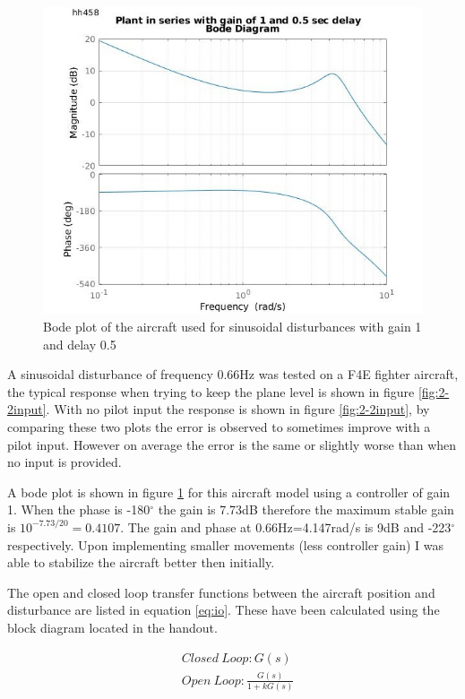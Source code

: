 \documentclass[twoside,twocolumn]{article}
\begin{document}
\begin{figure}[h]
  \centering
    \includegraphics[width=\linewidth]{2-2_bode}
  \caption{Bode plot of the aircraft used for sinusoidal disturbances with gain 1 and delay 0.5}
  \label{fig:2-2bode}
\end{figure}

A sinusoidal disturbance of frequency 0.66Hz was tested on a F4E fighter aircraft, the typical response when trying to keep the plane level is shown in figure \ref{fig:2-2input}. With no pilot input the response is shown in figure \ref{fig:2-2input}, by comparing these two plots the error is observed to sometimes improve with a pilot input. However on average the error is the same or slightly worse than when no input is provided.

A bode plot is shown in figure \ref{fig:2-2bode} for this aircraft model using a controller of gain 1. When the phase is -180$^{\circ}$ the gain is 7.73dB therefore the maximum stable gain is $ 10^{-7.73/20}=0.4107$. The gain and phase at 0.66Hz=4.147rad/s is 9dB and -223$^{\circ}$ respectively. Upon implementing smaller movements (less controller gain) I was able to stabilize the aircraft better then initially.

The open and closed loop transfer functions between the aircraft position and disturbance are listed in equation \ref{eq:io}. These have been calculated using the block diagram located in the handout.

\begin{equation}
\label{eq:io}
\begin{split}
&Closed \: Loop: G(s)\\
&Open \: Loop: \frac{G(s)}{1+kG(s)}\\
\end{split}
\end{equation}
\end{document}
